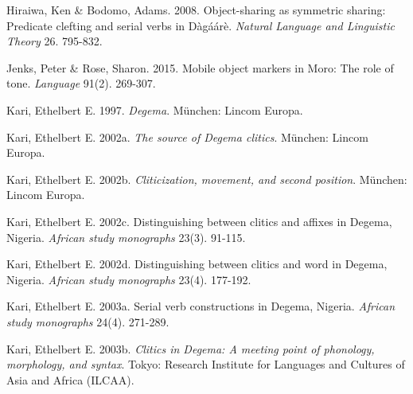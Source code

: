 \begin{styleNoSpacing}
Hiraiwa, Ken \& Bodomo, Adams. 2008. Object-sharing as symmetric sharing: Predicate clefting and serial verbs in Dàgáárè. \textit{Natural Language and Linguistic Theory} 26. 795-832.
\end{styleNoSpacing}

\begin{styleNoSpacing}
Jenks, Peter \& Rose, Sharon. 2015. Mobile object markers in Moro: The role of tone. \textit{Language} 91(2). 269-307.
\end{styleNoSpacing}

\begin{styleNoSpacing}
Kari, Ethelbert E. 1997. \textit{Degema}. München: Lincom Europa.
\end{styleNoSpacing}

\begin{styleNoSpacing}
Kari, Ethelbert E. 2002a. \textit{The source of Degema clitics}. München: Lincom Europa.
\end{styleNoSpacing}

\begin{styleNoSpacing}
Kari, Ethelbert E. 2002b. \textit{Cliticization, movement, and second position}. München: Lincom Europa. 
\end{styleNoSpacing}

\begin{styleNoSpacing}
Kari, Ethelbert E. 2002c. Distinguishing between clitics and affixes in Degema, Nigeria. \textit{African study monographs} 23(3). 91-115. 
\end{styleNoSpacing}

\begin{styleNoSpacing}
Kari, Ethelbert E. 2002d. Distinguishing between clitics and word in Degema, Nigeria. \textit{African study monographs} 23(4). 177-192.
\end{styleNoSpacing}

\begin{styleNoSpacing}
Kari, Ethelbert E. 2003a. Serial verb constructions in Degema, Nigeria. \textit{African study monographs} 24(4). 271-289.
\end{styleNoSpacing}

\begin{styleNoSpacing}
Kari, Ethelbert E. 2003b. \textit{Clitics in Degema: A meeting point of phonology, morphology, and syntax}. Tokyo: Research Institute for Languages and Cultures of Asia and Africa (ILCAA).
\end{styleNoSpacing}

